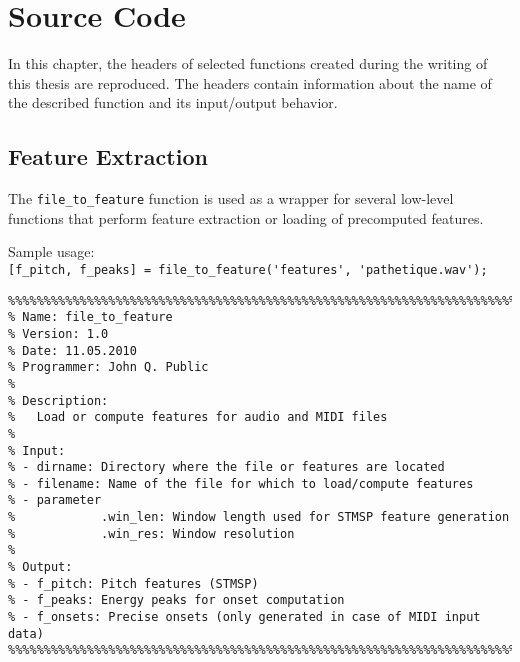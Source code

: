 \chapter{Source Code}
\label{chapter:source_code}

In this chapter, the headers of selected \MATLAB{} functions created during the writing of this thesis are reproduced. The headers contain information about the name of the described function and its input/output behavior.

\section*{Feature Extraction}
The \texttt{file\_to\_feature} function is used as a wrapper for several low-level functions that perform feature extraction or loading of precomputed features.

Sample usage:\\
\scriptsize
\verb|[f_pitch, f_peaks] = file_to_feature('features', 'pathetique.wav');|

\begin{verbatim}
%%%%%%%%%%%%%%%%%%%%%%%%%%%%%%%%%%%%%%%%%%%%%%%%%%%%%%%%%%%%%%%%%%%%%%%%%%%
% Name: file_to_feature
% Version: 1.0
% Date: 11.05.2010
% Programmer: John Q. Public
%
% Description:
%   Load or compute features for audio and MIDI files
%
% Input:
% - dirname: Directory where the file or features are located
% - filename: Name of the file for which to load/compute features
% - parameter
%            .win_len: Window length used for STMSP feature generation
%            .win_res: Window resolution
%
% Output:
% - f_pitch: Pitch features (STMSP)
% - f_peaks: Energy peaks for onset computation
% - f_onsets: Precise onsets (only generated in case of MIDI input data)
%%%%%%%%%%%%%%%%%%%%%%%%%%%%%%%%%%%%%%%%%%%%%%%%%%%%%%%%%%%%%%%%%%%%%%%%%%%
\end{verbatim}
\normalsize
